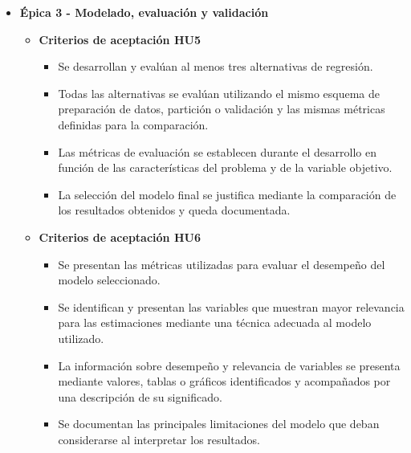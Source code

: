 \documentclass[
11pt, %
]{charter}
\begin{document}
\begin{itemize}
\begin{itemize}
      \item \textbf{Criterios de aceptación HU4}
        \begin{itemize}
          \item A partir de los datos correspondientes a una aplicación, el sistema genera una estimación económica expresada por unidad de superficie.
          \item La estimación se calcula utilizando la variable objetivo acordada con los interesados y las variables definidas durante el desarrollo del modelo.
          \item Ante los mismos datos de entrada y la misma versión del modelo, se obtiene el mismo resultado de la estimación.
          \item El resultado se presenta identificando la variable estimada, el valor obtenido y la unidad de medida correspondiente.
        \end{itemize}

    \end{itemize}


  \item \textbf{\'{E}pica 3 - Modelado, evaluación y validación}
    \begin{itemize}

      \item \textbf{Criterios de aceptación HU5}
        \begin{itemize}
          \item Se desarrollan y evalúan al menos tres alternativas de regresión.
          \item Todas las alternativas se evalúan utilizando el mismo esquema de preparación de datos, partición o validación y las mismas métricas definidas para la comparación.
          \item Las métricas de evaluación se establecen durante el desarrollo en función de las características del problema y de la variable objetivo.
          \item La selección del modelo final se justifica mediante la comparación de los resultados obtenidos y queda documentada.
        \end{itemize}

      \item \textbf{Criterios de aceptación HU6}
        \begin{itemize}
          \item Se presentan las métricas utilizadas para evaluar el desempeño del modelo seleccionado.
          \item Se identifican y presentan las variables que muestran mayor relevancia para las estimaciones mediante una técnica adecuada al modelo utilizado.
          \item La información sobre desempeño y relevancia de variables se presenta mediante valores, tablas o gráficos identificados y acompañados por una descripción de su significado.
          \item Se documentan las principales limitaciones del modelo que deban considerarse al interpretar los resultados.
        \end{itemize}


\end{itemize}
\end{itemize}
\end{document}
